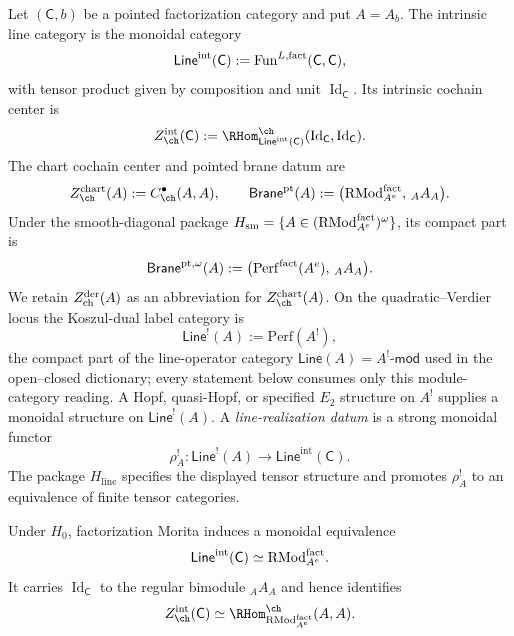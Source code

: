 \begin{definition}
\label{def:mr-pointed-operator-data}
Let $(\mathsf C,b)$ be a pointed factorization category and put
$A=A_b$.  The intrinsic line category is the monoidal category
\[
 \mathsf{Line}^{\mathrm{int}}(\mathsf C)
 :=\operatorname{Fun}^{L,\mathrm{fact}}(\mathsf C,\mathsf C),
\]
with tensor product given by composition and unit
$\operatorname{Id}_{\mathsf C}$.  Its intrinsic cochain center is
\[
 Z_{\ch}^{\mathrm{int}}(\mathsf C)
 :=\RHom^{\ch}_{\mathsf{Line}^{\mathrm{int}}(\mathsf C)}
 (\operatorname{Id}_{\mathsf C},\operatorname{Id}_{\mathsf C}).
\]
The chart cochain center and pointed brane datum are
\[
 Z_{\ch}^{\mathrm{chart}}(A):=C^\bullet_{\ch}(A,A),
 \qquad
 \mathsf{Brane}^{\mathrm{pt}}(A)
 :=\bigl(\mathrm{RMod}^{\fact}_{A^e},\,{}_AA_A\bigr).
\]
Under the smooth-diagonal package
$H_{\mathrm{sm}}=\{A\in(\mathrm{RMod}^{\mathrm{fact}}_{A^e})^\omega\}$, its
compact part is
\[
 \mathsf{Brane}^{\mathrm{pt},\omega}(A)
 :=\bigl(\mathrm{Perf}^{\mathrm{fact}}(A^e),\,{}_AA_A\bigr).
\]
We retain $Z^{\mathrm{der}}_{\mathrm{ch}}(A)$ as an abbreviation for
$Z_{\ch}^{\mathrm{chart}}(A)$.  On the quadratic--Verdier locus the
Koszul-dual label category is
\[
 \mathsf{Line}^{!}(A):=\mathrm{Perf}(A^!),
\]
the compact part of the line-operator category
$\mathsf{Line}(A)=A^!\text{-}\mathsf{mod}$ used in the
open--closed dictionary; every statement below consumes only this
module-category reading.
A Hopf, quasi-Hopf, or specified $E_2$ structure on $A^!$ supplies a
monoidal structure on $\mathsf{Line}^{!}(A)$.  A
\emph{line-realization datum} is a strong monoidal functor
\[
 \rho_A^!\colon
 \mathsf{Line}^{!}(A)\longrightarrow
 \mathsf{Line}^{\mathrm{int}}(\mathsf C).
\]
The package $H_{\mathrm{line}}$ specifies the displayed tensor
structure and promotes $\rho_A^!$ to an equivalence of finite tensor
categories.
\end{definition}

\begin{proposition}
\label{prop:mr-factorization-ew-lines}
Under $H_0$, factorization Morita induces a monoidal equivalence
\[
 \mathsf{Line}^{\mathrm{int}}(\mathsf C)
 \simeq
 \mathrm{RMod}^{\mathrm{fact}}_{A^e}.
\]
It carries $\operatorname{Id}_{\mathsf C}$ to the regular bimodule
${}_AA_A$ and hence identifies
\[
 Z_{\ch}^{\mathrm{int}}(\mathsf C)
 \simeq
 \RHom^{\ch}_{\mathrm{RMod}^{\fact}_{A^e}}(A,A).
\]
\end{proposition}

